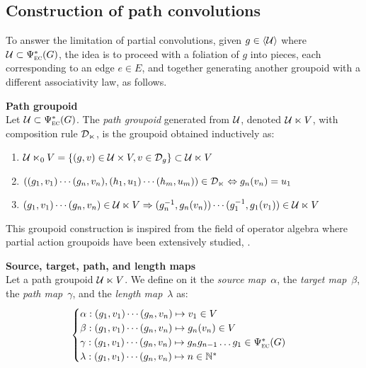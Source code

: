 \subsection{Construction of path convolutions}

To answer the limitation of partial convolutions, given $g \in \langle \mathcal{U} \rangle$ where $\mathcal{U} \subset \Psi_{\operatorname{\textsc{ec}}}^*(G)$, the idea is to proceed with a foliation of $g$ into pieces, each corresponding to an edge $e \in E$, and together generating another groupoid with a different associativity law, as follows.


\begin{definition}\textbf{Path groupoid}\\
Let $\mathcal{U} \subset \Psi_{\operatorname{\textsc{ec}}}^*(G)$. The \emph{path groupoid} generated from $\mathcal{U}$, denoted $\mathcal{U} \ltimes V$, with composition rule $\mathcal{D}_{\ltimes}$, is the groupoid obtained inductively as:
\begin{enumerate}
  \item $\mathcal{U} \ltimes_0 V = \{(g,v) \in \mathcal{U} \times V, v \in \mathcal{D}_g \} \subset \mathcal{U} \ltimes V$
  \item $((g_1,v_1) \cdots (g_n,v_n) , (h_1,u_1) \cdots (h_m,u_m)) \in \mathcal{D}_{\ltimes} \Leftrightarrow g_n(v_n) = u_1$
  \item $(g_1,v_1) \cdots (g_n,v_n) \in \mathcal{U} \ltimes V \Rightarrow (g_n^{-1}, g_n(v_n)) \cdots (g_1^{-1}, g_1(v_1)) \in \mathcal{U} \ltimes V$
\end{enumerate}
\end{definition}

\begin{remark}
This groupoid construction is inspired from the field of operator algebra where partial action groupoids have been extensively studied, \eg \cite{nica1994groupoid,exel1998partial,li2016partial}.
\end{remark}

\begin{definition}\textbf{Source, target, path, and length maps}\\
Let a path groupoid $\mathcal{U} \ltimes V$. We define on it the \emph{source map}~$\alpha$, the \emph{target map}~$\beta$, the \emph{path map}~$\gamma$, and the \emph{length map}~$\lambda$ as:
\begin{gather*}
\begin{cases}
  \alpha: (g_1,v_1) \cdots (g_n,v_n) \mapsto v_1 \in V\\
  \beta: (g_1,v_1) \cdots (g_n,v_n) \mapsto g_n(v_n) \in V\\
  \gamma: (g_1,v_1) \cdots (g_n,v_n) \mapsto g_ng_{n-1}\ldots g_1 \in \Psi_{\operatorname{\textsc{ec}}}^*(G)\\
  \lambda: (g_1,v_1) \cdots (g_n,v_n) \mapsto n \in \mathbb{N}^*
\end{cases}
\end{gather*}
\end{definition}

